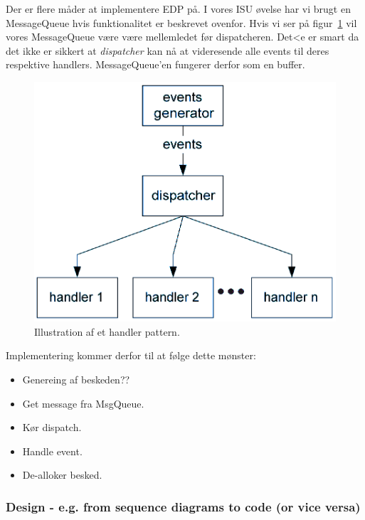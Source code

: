 Der er flere måder at implementere EDP på. I vores ISU øvelse har vi brugt en MessageQueue hvis funktionalitet er beskrevet ovenfor.
Hvis vi ser på figur~\ref{fig:handlPat} vil vores MessageQueue være være mellemledet før dispatcheren. Det<e er smart da det ikke er sikkert at \textit{dispatcher} kan nå at videresende alle events til deres respektive handlers. MessageQueue'en fungerer derfor som en buffer.

\begin{figure}[h]
	\centering
	\includegraphics[width=0.6\linewidth]{figs/spm3/handlersPattern}
	\caption{Illustration af et handler pattern.}
	\label{fig:handlPat}
\end{figure}

Implementering kommer derfor til at følge dette mønster:

\begin{itemize}
	\item Genereing af beskeden?? 
	\item Get message fra MsgQueue.
	\item Kør dispatch.
	\item Handle event.
	\item De-alloker besked.
\end{itemize}

\subsubsection{Design - e.g. from sequence diagrams to code (or vice versa)}
